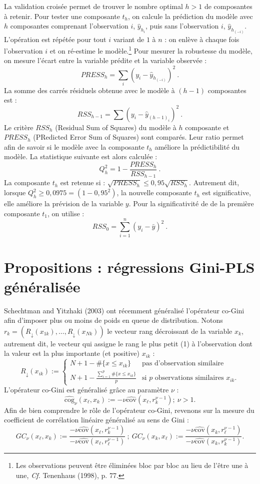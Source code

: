 \documentclass[a4paper, 12pt]{article}
\newcommand{\cov}{\text{cov}}
\newcommand{\cog}{\text{cog}}
\numberwithin{equation}{section}
\begin{document}
La validation croisée permet de trouver le nombre optimal $h>1$ de composantes à retenir. Pour tester une composante $t_h$, on calcule la prédiction du modèle avec $h$ composantes comprenant l'observation $i$, $\hat{y}_{h_i}$, puis sans l'observation $i$, $\hat{y}_{h_{(-i)}}$. L'opération est répétée pour tout $i$ variant de $1$ à $n$ : on enlève à chaque fois l'observation $i$ et on ré-estime le modèle.\footnote{Les observations peuvent être éliminées bloc par bloc au lieu de l'être une à une, \emph{Cf.} Tenenhaus (1998), p. 77.} Pour mesurer la robustesse du modèle, on mesure l'écart entre la variable prédite et la variable observée :
\[
PRESS_h =  \sum_i\left(y_i - \hat{y}_{h_{(-i)}}\right)^2 \ .
\]
La somme des carrés résiduels obtenue avec le modèle à $(h-1)$ composantes est : 
\[
RSS_{h-1} = \sum \left(y_i - \hat{y}_{(h-1)_i}\right)^2 \ .
\]
Le critère $RSS_h$ (Residual Sum of Squares) du modèle à $h$ composante et $PRESS_h$ (PRedicted Error Sum of Squares) sont comparés. Leur ratio permet afin de savoir si le modèle avec la composante $t_h$ améliore la prédictibilité du modèle. La statistique suivante est alors calculée :
\[
Q^2_h =1 - \frac{PRESS_h}{RSS_{h-1}} \ .
\]
La composante $t_h$ est retenue si : $\sqrt{PRESS_h} \leq 0,95 \sqrt{RSS_h}$. Autrement dit, lorsque $Q^2_h \geq 0,0975 = (1 - 0,95^2)$, la nouvelle composante $t_h$ est significative, elle améliore la prévision de la variable $y$. Pour la significativité de de la première composante $t_1$,  on utilise :
\[
RSS_0 = \sum^{n}_{i = 1} \left(y_i - \bar{y}\right)^2  \ .
\]


\section{Propositions : régressions Gini-PLS généralisée} 

Schechtman and Yitzhaki (2003) ont récemment généralisé l'opérateur co-Gini afin d'imposer plus ou moins de poids en queue de distribution. Notons $r_{k}=(R_\downarrow(x_{1k}),\ldots, R_\downarrow(x_{Nk}))$ le vecteur rang décroissant de la variable $x_k$, autrement dit, le vecteur qui assigne le rang le plus petit (1) à l'observation dont la valeur est la plus importante (et positive) $x_{ik}$ :
\[
R_\downarrow(x_{ik}) :=
\left\{ \begin{array}{ll}
N+1- \#\{x \leq x_{ik} \} & \text{pas d'observation similaire} \\
N+1-\frac{\sum_{i=1}^p \#\{ x \leq x_{ik}  \}}{p} & \text{si $p$ observations similaires $x_{ik}$.}
\end{array}
\right.
\]
L'opérateur co-Gini est généralisé grâce au paramètre $\nu$ :
\begin{equation}\label{cogg}
\widehat{\cog}_\nu(x_\ell,x_k) := -\nu \widehat{\cov}(x_\ell,r_{k}^{\nu-1}) ;  \ \nu > 1.
\end{equation}
Afin de bien comprendre le rôle de l'opérateur co-Gini, revenons sur la mesure du coefficient de corrélation linéaire généralisé au sens de Gini :
\[
GC_\nu(x_\ell,x_k) := \frac{-\nu \widehat{\cov}(x_\ell,r_{k}^{\nu-1})}{-\nu \widehat{\cov}(x_\ell,r_{\ell}^{\nu-1})} \ ; \ GC_\nu(x_k,x_\ell) := \frac{-\nu \widehat{\cov}(x_k,r_{\ell}^{\nu-1})}{-\nu \widehat{\cov}(x_k,r_{k}^{\nu-1})}.
\]
\end{document}

